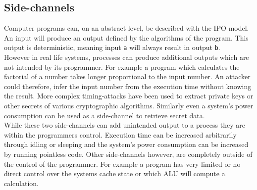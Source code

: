 \documentclass[conference,compsoc,final,a4paper]{IEEEtran}
\begin{document}
\subsection{Side-channels}
Computer programs can, on an abstract level, be described with the \ac{IPO} model. An input will produce an output defined by the algorithms
of the program. This output is deterministic, meaning input \lstinline|a| will always result in output \lstinline|b|. \\
However in real life systems, processes can produce additional outputs which are not intended by its programmer. For example a program which calculates the
factorial of a number takes longer proportional to the input number. An attacker could therefore, infer the input number from the execution time without knowing the
result. More complex timing-attacks have been used to extract private keys or other secrets
of various cryptographic algorithms. \cite{bernstein2005cache}\cite{kocher1996timing}
Similarly even a system's power consumption can be used as a side-channel to retrieve secret data. \cite{kocher1999differential} \\
While these two side-channels can add unintended output to a process they are within the programmers control. Execution time can be increased arbitrarily through
idling or sleeping and the system's power consumption can be increased by running pointless code. Other side-channels however, are completely outside of the
control of the programmer. For example a program has very limited or no direct control over the systems cache state or which \ac{ALU} will compute a calculation. \cite{kocher2018spectre}
\end{document}
